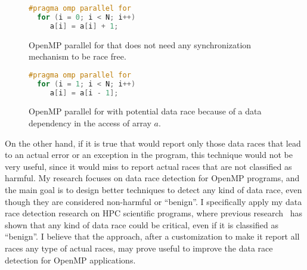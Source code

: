 \begin{refsection}
\begin{figure}[t]
  \begin{minipage}[t]{0.4\textwidth}
\begin{lstlisting}[language=C]
  #pragma omp parallel for
  for (i = 0; i < N; i++)
     a[i] = a[i] + 1;
\end{lstlisting}
    \vspace{-10pt}
\caption{OpenMP parallel for that does not need any synchronization mechanism
  to be race free.}
\label{fig:openmp1}
\end{minipage}
\hfill
\begin{minipage}[t]{0.4\textwidth}
\begin{lstlisting}[language=C]
  #pragma omp parallel for
  for (i = 1; i < N; i++)
     a[i] = a[i - 1];
\end{lstlisting}
  \vspace{-10pt}
\caption{OpenMP parallel for with potential data race because of a data
  dependency in the access of array $a$.}
\label{fig:openmp2}
\end{minipage}
\vspace{-10pt}
\end{figure}

On the other hand, if it is true that \rfuz would report only those data races
that lead to an actual error or an exception in the program, this technique
would not be very useful, since it would miss to report actual races that are
not classified as harmful.
%
My research focuses on data race detection for OpenMP programs, and the main
goal is to design better techniques to detect any kind of data race, even
though they are considered non-harmful or ``benign''.
%
I specifically apply my data race detection research on HPC scientific
programs, where previous research~\cite{ec2_2015-agralslpm} has shown that any
kind of data race could be critical, even if it is classified as ``benign''.
%
I believe that the \rfuz approach, after a customization to make it report all
races any type of actual races, may prove useful to improve the data race
detection for OpenMP applications.


\end{refsection}
